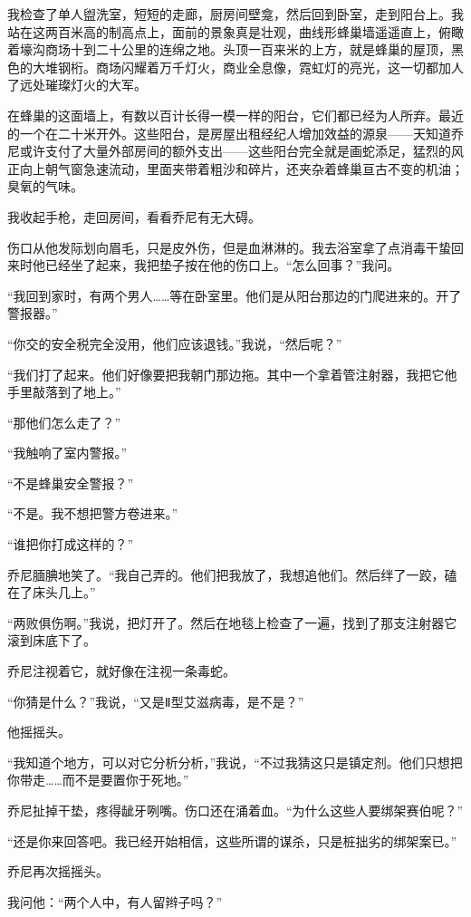 \documentclass[AutoFakeBold=true]{book}
\begin{document}
我检查了单人盥洗室，短短的走廊，厨房间壁龛，然后回到卧室，走到阳台上。我站在这两百米高的制高点上，面前的景象真是壮观，曲线形蜂巢墙遥遥直上，俯瞰着壕沟商场十到二十公里的连绵之地。头顶一百来米的上方，就是蜂巢的屋顶，黑色的大堆钢桁。商场闪耀着万千灯火，商业全息像，霓虹灯的亮光，这一切都加人了远处璀璨灯火的大军。

在蜂巢的这面墙上，有数以百计长得一模一样的阳台，它们都已经为人所弃。最近的一个在二十米开外。这些阳台，是房屋出租经纪人增加效益的源泉——天知道乔尼或许支付了大量外部房间的额外支出——这些阳台完全就是画蛇添足，猛烈的风正向上朝气窗急速流动，里面夹带着粗沙和碎片，还夹杂着蜂巢亘古不变的机油；臭氧的气味。

我收起手枪，走回房间，看看乔尼有无大碍。

伤口从他发际划向眉毛，只是皮外伤，但是血淋淋的。我去浴室拿了点消毒干蛰回来时他已经坐了起来，我把垫子按在他的伤口上。``怎么回事？''我问。

``我回到家时，有两个男人……等在卧室里。他们是从阳台那边的门爬进来的。开了警报器。''

``你交的安全税完全没用，他们应该退钱。''我说，``然后呢？''

``我们打了起来。他们好像要把我朝门那边拖。其中一个拿着管注射器，我把它他手里敲落到了地上。''

``那他们怎么走了？''

``我触响了室内警报。''

``不是蜂巢安全警报？''

``不是。我不想把警方卷进来。''

``谁把你打成这样的？''

乔尼腼腆地笑了。``我自己弄的。他们把我放了，我想追他们。然后绊了一跤，磕在了床头几上。''

``两败俱伤啊。''我说，把灯开了。然后在地毯上检查了一遍，找到了那支注射器它滚到床底下了。

乔尼注视着它，就好像在注视一条毒蛇。

``你猜是什么？''我说，``又是Ⅱ型艾滋病毒，是不是？''

他摇摇头。

``我知道个地方，可以对它分析分析，''我说，``不过我猜这只是镇定剂。他们只想把你带走……而不是要置你于死地。''

乔尼扯掉干垫，疼得龇牙咧嘴。伤口还在涌着血。``为什么这些人要绑架赛伯呢？''

``还是你来回答吧。我已经开始相信，这些所谓的谋杀，只是桩拙劣的绑架案已。''

乔尼再次摇摇头。

我问他：``两个人中，有人留辫子吗？''
\end{document}
